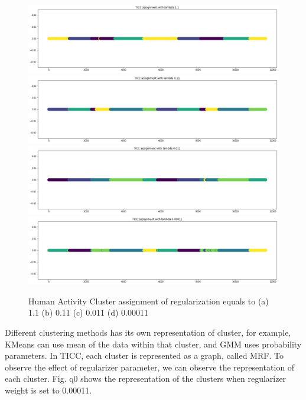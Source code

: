 \documentclass{llncs}
\begin{document}
\begin{figure}[H]
    \centering
    \includegraphics[width=.5\textwidth]{lambda1+1.png}\hfill
    \includegraphics[width=.5\textwidth]{lambda0+11.png}
    \includegraphics[width=.5\textwidth]{lambda+011.png}\hfill
    \includegraphics[width=.5\textwidth]{lambda0+00011.png}
    \caption{Human Activity Cluster assignment of regularization equals to (a) 1.1 (b) 0.11 (c) 0.011 (d) 0.00011}
    \label{fig:reg}
\end{figure}

Different clustering methods has its own representation of cluster, for example, KMeans can use mean of the data within that cluster, and GMM uses probability parameters. In TICC, each cluster is represented as a graph, called MRF. To observe the effect of regularizer parameter, we can observe the representation of each cluster. Fig. q0 shows the representation of the clusters when regularizer weight is set to 0.00011.
\end{document}
